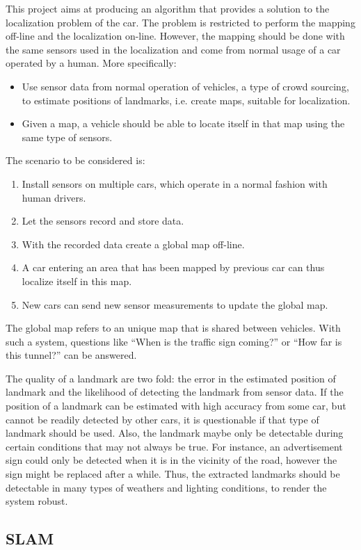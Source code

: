 This project aims at producing an algorithm that provides a solution to the localization problem of the car. The problem is restricted to perform the mapping off-line and the localization on-line. However, the mapping should be done with the same sensors used in the localization and come from normal usage of a car operated by a human.  More
specifically:
\begin{itemize}
\item Use sensor data from normal operation of vehicles, a type of crowd sourcing, to estimate positions of landmarks, i.e. create maps, suitable for localization.

\item Given a map, a vehicle should be able to locate itself in that map using the same type of sensors.
\end{itemize}
The scenario to be considered is:
\begin{enumerate}
\item Install sensors on multiple cars, which operate in a normal fashion with human drivers.
\item Let the sensors record and store data.
\item With the recorded data create a global map off-line.
\item A car entering an area that has been mapped by previous car can
  thus localize itself in this map.
\item New cars can send new sensor measurements to update the global
  map.
\end{enumerate}
The global map refers to an unique map that is shared between
vehicles. With such a system, questions like ``When is the traffic sign
coming?'' or  ``How far is this tunnel?'' can be answered.

The quality of a landmark are two fold: the error in the estimated position of landmark and the likelihood of detecting the landmark from sensor data. If the position of a landmark can be estimated with high accuracy from some car, but cannot be readily detected by other cars, it is questionable if that type of landmark should be used. Also, the landmark maybe only be detectable during certain conditions that may not always be true. For instance, an advertisement sign could only be detected when it is in the vicinity of the road, however the sign might be replaced after a while. Thus, the extracted landmarks should be detectable in many types of
weathers and lighting conditions, to render the system robust.


\subsection{SLAM}

